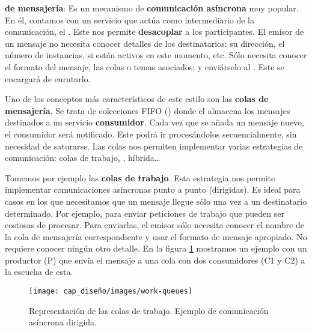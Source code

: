 \textbf{ de mensajería}: Es un mecanismo de \textbf{comunicación asíncrona} muy popular. En él, contamos con un servicio que actúa como intermediario de la comunicación, el \textbf{}. \cite{newmanBuildingMicroservicesDesigning2021} Este nos permite \textbf{desacoplar} a los participantes. \cite{korabUnderstandingMessageBrokers2017} El emisor de un mensaje no necesita conocer detalles de los destinatarios: su dirección, el número de instancias, si están activos en este momento, etc. Sólo necesita conocer el formato del mensaje, las colas o temas asociados; y enviárselo al . Este se encargará de enrutarlo.

Uno de los conceptos más característicos de este estilo son las \textbf{colas de mensajería}. Se trata de colecciones FIFO () donde el  almacena los mensajes destinados a un servicio \textbf{consumidor}. Cada vez que se añada un mensaje nuevo, el consumidor será notificado. Este podrá ir procesándolos secuencialmente, sin necesidad de saturarse. Las colas nos permiten implementar varias estrategias de comunicación: colas de trabajo, , híbrida\dots

Tomemos por ejemplo las \textbf{colas de trabajo}. \cite{royChapterMessagePatterns2017} Esta estrategia nos permite implementar comunicaciones asíncronas punto a punto (dirigidas). Es ideal para casos en los que necesitamos que un mensaje llegue sólo una vez a un destinatario determinado. \cite{ibmWhatAreMessage2020} Por ejemplo, para enviar peticiones de trabajo que pueden ser costosas de procesar. Para enviarlas, el emisor sólo necesita conocer el nombre de la cola de mensajería correspondiente y usar el formato de mensaje apropiado. No requiere conocer ningún otro detalle. En la figura \ref{fig:work-queues} mostramos un ejemplo con un productor (P) que envía el mensaje a una cola con dos consumidores (C1 y C2) a la escucha de esta.

\begin{figure}[htb]
  \centering
  \texttt{[image: cap\_diseño/images/work-queues]}
  \caption[Representación de las colas de trabajo. Ejemplo de comunicación asíncrona dirigida.]{Representación de las colas de trabajo. Ejemplo de comunicación asíncrona dirigida. \footnotemark }
  \label{fig:work-queues}
\end{figure}


